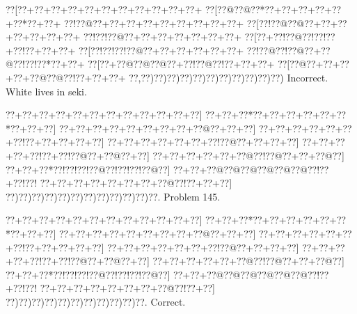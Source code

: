 \documentclass[a5paper]{article}
\begin{document}
\begin{center}
{\goo
\0??[\0??+\0??+\0??+\0??+\0??+\0??+\0??+\0??+\0??+\0??+\0??+
\0??[\0??@\0??@\0??*\0??+\0??+\0??+\0??+\0??+\0??*\0??+\0??+
\0??!\0??@\0??+\0??+\0??+\0??+\0??+\0??+\0??+\0??+\0??+
\0??[\0??!\0??@\0??@\0??+\0??+\0??+\0??+\0??+\0??+\0??+
\0??!\0??!\0??@\0??+\0??+\0??+\0??+\0??+\0??+\0??+
\0??[\0??+\0??!\0??@\0??!\0??!\0??+\0??!\0??+\0??+\0??+
\0??[\0??!\0??!\0??!\0??@\0??+\0??+\0??+\0??+\0??+\0??+
\0??!\0??@\0??!\0??@\0??+\0??@\0??!\0??!\0??*\0??+\0??+
\0??[\0??+\0??@\0??@\0??@\0??+\0??!\0??@\0??!\0??+\0??+\0??+
\0??[\0??@\0??+\0??+\0??+\0??+\0??@\0??@\0??!\0??+\0??+\0??+
\0??,\0??)\0??)\0??)\0??)\0??)\0??)\0??)\0??)\0??)\0??)\0??)
}
Incorrect. White lives in seki.

\end{center}
\newpage
\begin{center}
{\goo
\0??+\0??+\0??+\0??+\0??+\0??+\0??+\0??+\0??+\0??+\0??+\0??]
\0??+\0??+\0??*\0??+\0??+\0??+\0??+\0??+\0??*\0??+\0??+\0??]
\0??+\0??+\0??+\0??+\0??+\0??+\0??+\0??+\0??@\0??+\0??+\0??]
\0??+\0??+\0??+\0??+\0??+\0??+\0??!\0??+\0??+\0??+\0??+\0??]
\0??+\0??+\0??+\0??+\0??+\0??+\0??!\0??@\0??+\0??+\0??+\0??]
\0??+\0??+\0??+\0??+\0??!\0??+\0??!\0??@\0??+\0??@\0??+\0??]
\0??+\0??+\0??+\0??+\0??+\0??@\0??!\0??@\0??+\0??+\0??@\0??]
\0??+\0??+\0??*\0??!\0??!\0??!\0??@\0??!\0??!\0??!\0??@\0??]
\0??+\0??+\0??@\0??@\0??@\0??@\0??@\0??@\0??!\0??+\0??!\0??!
\0??+\0??+\0??+\0??+\0??+\0??+\0??+\0??@\0??!\0??+\0??+\0??]
\0??)\0??)\0??)\0??)\0??)\0??)\0??)\0??)\0??)\0??)\0??)\0??.
}
Problem 145.

\end{center}
\begin{center}
{\goo
\0??+\0??+\0??+\0??+\0??+\0??+\0??+\0??+\0??+\0??+\0??+\0??]
\0??+\0??+\0??*\0??+\0??+\0??+\0??+\0??+\0??*\0??+\0??+\0??]
\0??+\0??+\0??+\0??+\0??+\0??+\0??+\0??+\0??@\0??+\0??+\0??]
\0??+\0??+\0??+\0??+\0??+\0??+\0??!\0??+\0??+\0??+\0??+\0??]
\0??+\0??+\0??+\0??+\0??+\0??+\0??!\0??@\0??+\0??+\0??+\0??]
\0??+\0??+\0??+\0??+\0??!\0??+\0??!\0??@\0??+\0??@\0??+\0??]
\0??+\0??+\0??+\0??+\0??+\0??@\0??!\0??@\0??+\0??+\0??@\0??]
\0??+\0??+\0??*\0??!\0??!\0??!\0??@\0??!\0??!\0??!\0??@\0??]
\0??+\0??+\0??@\0??@\0??@\0??@\0??@\0??@\0??!\0??+\0??!\0??!
\0??+\0??+\0??+\0??+\0??+\0??+\0??+\0??@\0??!\0??+\0??]
\0??)\0??)\0??)\0??)\0??)\0??)\0??)\0??)\0??)\0??)\0??.
}
Correct. 

\end{center}
\end{document}

